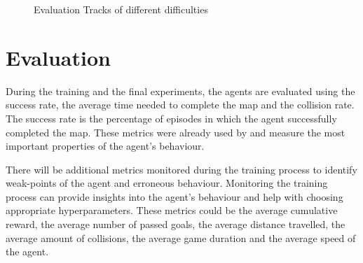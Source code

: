 \begin{figure}
    \centering
    \qquad
    \qquad
    \qquad
    \caption{Evaluation Tracks of different difficulties}
    \label{fig:3tracks}
\end{figure}

\section{Evaluation}

During the training and the final experiments, the agents are evaluated using the success rate, the average time needed to complete the map and the collision rate. The success rate is the percentage of episodes in which the agent successfully completed the map. These metrics were already used by \autocite{maximilian} and measure the most important properties of the agent's behaviour.

There will be additional metrics monitored during the training process to identify weak-points of the agent and erroneous behaviour. Monitoring the training process can provide insights into the agent's behaviour and help with choosing appropriate hyperparameters.
These metrics could be the average cumulative reward, the average number of passed goals, the average distance travelled, the average amount of collisions, the average game duration and the average speed of the agent.



